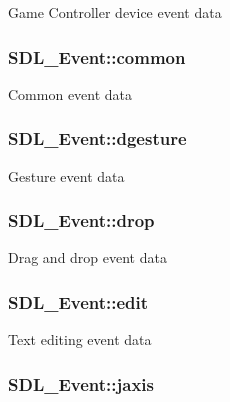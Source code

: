 Game Controller device event data \hypertarget{union_s_d_l___event_abe5cb8767f93de55163c8ddd4562a7f2}{
\subsubsection[{common}]{ S\-D\-L\-\_\-\-Event\-::common}}\label{union_s_d_l___event_abe5cb8767f93de55163c8ddd4562a7f2}
Common event data \hypertarget{union_s_d_l___event_a4481167b9f8549aeb254e97ca812e74d}{
\subsubsection[{dgesture}]{ S\-D\-L\-\_\-\-Event\-::dgesture}}\label{union_s_d_l___event_a4481167b9f8549aeb254e97ca812e74d}
Gesture event data \hypertarget{union_s_d_l___event_acff77bccbca65abbb876360a3f5209c9}{
\subsubsection[{drop}]{ S\-D\-L\-\_\-\-Event\-::drop}}\label{union_s_d_l___event_acff77bccbca65abbb876360a3f5209c9}
Drag and drop event data \hypertarget{union_s_d_l___event_a9a7e3b67b2654d4c5fc509676c6a7183}{
\subsubsection[{edit}]{ S\-D\-L\-\_\-\-Event\-::edit}}\label{union_s_d_l___event_a9a7e3b67b2654d4c5fc509676c6a7183}
Text editing event data \hypertarget{union_s_d_l___event_ac4611acd0e9c675e67dc20919f0accb4}{
\subsubsection[{jaxis}]{ S\-D\-L\-\_\-\-Event\-::jaxis}}\label{union_s_d_l___event_ac4611acd0e9c675e67dc20919f0accb4}
